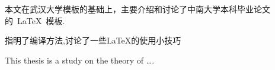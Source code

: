 

\begin{cnabstract}

本文在武汉大学模板的基础上，主要介绍和讨论了中南大学本科毕业论文的~\LaTeX~模板.

指明了编译方法,讨论了一些\LaTeX{}的使用小技巧
\end{cnabstract}
\par
\vspace*{1em}	%



\begin{enabstract}
This thesis is a study on the theory of \dots.

\end{enabstract}
\par
\vspace*{2em}

